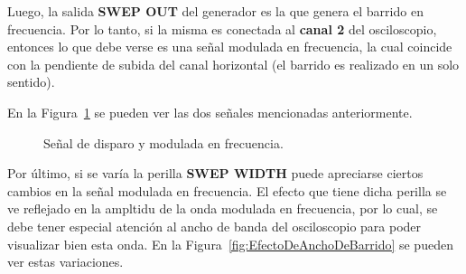     Luego, la salida \textbf{SWEP OUT} del generador es la que genera el barrido en frecuencia. Por lo tanto, si la misma
    es conectada al \textbf{canal 2} del osciloscopio, entonces lo que debe verse es una señal modulada en frecuencia, la cual
    coincide con la pendiente de subida del canal horizontal (el barrido es realizado en un solo sentido). 

    En la Figura~\ref{fig:SeñalDisparoySeñalFM} se pueden ver las dos señales mencionadas anteriormente.

    \begin{figure}[H]
      \centering
      \caption{Señal de disparo y modulada en frecuencia.}
      \label{fig:SeñalDisparoySeñalFM}
    \end{figure}

    Por último, si se varía la perilla \textbf{SWEP WIDTH} puede apreciarse ciertos cambios en la señal modulada en frecuencia.
    El efecto que tiene dicha perilla se ve reflejado en la ampltidu de la onda modulada en frecuencia, por lo cual, se debe
    tener especial atención al ancho de banda del osciloscopio para poder visualizar bien esta onda. En la 
    Figura~\ref{fig:EfectoDeAnchoDeBarrido} se pueden ver estas variaciones.


